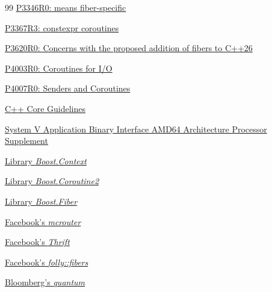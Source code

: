 \begin{thebibliography}{99}
        \href{https://www.open-std.org/jtc1/sc22/wg21/docs/papers/2024/p3346r0.pdf}
        {P3346R0: \tlocal means fiber-specific}

        \href{https://www.open-std.org/jtc1/sc22/wg21/docs/papers/2025/p3367r3.html}
        {P3367R3: constexpr coroutines}

        \href{https://isocpp.org/files/papers/P3620R0.pdf}
        {P3620R0: Concerns with the proposed addition of fibers to C++26}

        \href{https://wg21.link/p4003}
        {P4003R0: Coroutines for I/O}

        \href{https://wg21.link/p4007}
        {P4007R0: Senders and Coroutines}

        \href{http://isocpp.github.io/CppCoreGuidelines/CppCoreGuidelines#Ri-global}
        {C++ Core Guidelines}

        \href{http://software.intel.com/sites/default/files/article/402129/mpx-linux64-abi.pdf}
        {System V Application Binary Interface AMD64 Architecture Processor
        Supplement}

        \href{http://www.boost.org/doc/libs/release/libs/context/doc/html/index.html}
        {Library \emph{Boost.Context}}

        \href{http://www.boost.org/doc/libs/release/libs/coroutine2/doc/html/index.html}
        {Library \emph{Boost.Coroutine2}}

        \href{http://www.boost.org/doc/libs/release/libs/fiber/doc/html/index.html}
        {Library \emph{Boost.Fiber}}

        \href{https://code.facebook.com/posts/296442737213493/introducing-mcrouter-a-memcached-protocol-router-for-scaling-memcached-deployments}
        {Facebook's \emph{mcrouter}}

        \href{https://github.com/facebook/fbthrift}
        {Facebook's \emph{Thrift}}

        \href{https://github.com/facebook/folly/tree/master/folly/fibers}
        {Facebook's \emph{folly::fibers}}

        \href{https://github.com/bloomberg/quantum}
        {Bloomberg's \emph{quantum}}


\end{thebibliography}
